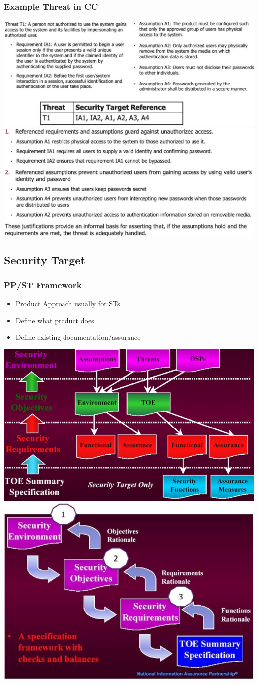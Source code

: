 \subsubsection{Example Threat in CC}
\includegraphics[width=\linewidth]{../img/example_threat_cc.png}
\includegraphics[width=\linewidth]{../img/example_threat_cc2.png}

\subsection{Security Target}
\subsubsection{PP/ST Framework}
\begin{itemize}
    \item Product Approach usually for STs
    \item Define what product does
    \item Define existing documentation/assurance
\end{itemize}
\includegraphics[width=0.5\linewidth]{../img/pp_st_framework.png}
\includegraphics[width=0.5\linewidth]{../img/pp_st_framework2.png}

